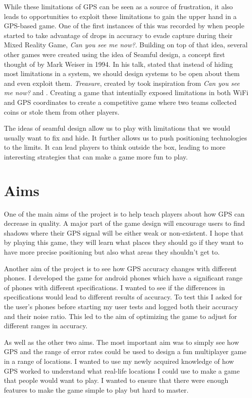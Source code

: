 \documentclass{l4proj}
\begin{document}
While these limitations of GPS can be seen as a source of frustration, it also leads to
opportunities to exploit these limitations to gain the upper hand in a GPS-based game. One
of the first instances of this was recorded by \cite{canyouseeme} when people started to 
take advantage of drops in accuracy to evade capture during their Mixed Reality Game,
\emph{Can you see me now?}. Building on top of that idea, several other games were 
created using the idea of Seamful design, a concept first thought of by Mark Weiser in
1994. In his talk, \cite{weiser1994} stated that instead of hiding most limitations in 
a system, we should design systems to be open about them and even exploit them. \emph{Treasure},
created by \cite{Barkhuus2005} took inspiration from \emph{Can you see me now?} and \cite{weiser1994}.
Creating a game that intentially exposed limitations in both WiFi and GPS coordinates to create
a competitive game where two teams collected coins or stole them from other players.

The ideas of seamful design allow us to play with limitations that we would usually want to fix
and hide. It further allows us to push positioning technologies to the limits. It
can lead players to think outside the box, leading to more interesting strategies that can make a
game more fun to play.

\section{Aims}
\label{aims}
One of the main aims of the project is to help teach players about how GPS can decrease in quality. A major
part of the game design will encourage users to find shadows where their GPS signal will be either weak or
non-existent. I hope that by playing this game, they will learn what places they should
go if they want to have more precise positioning but also what areas they shouldn't get to.

Another aim of the project is to see how GPS accuracy changes with different phones. I developed the game
for android phones which have a significant range of phones with different specifications. I wanted to 
see if the differences in specifications would lead to different results of accuracy. To test this I 
asked for the user's phones before starting my user tests and logged both their accuracy and their noise
ratio. This led to the aim of optimizing the game to adjust for different ranges in accuracy.

As well as the other two aims. The most important aim was to simply see how GPS and the range of
error rates could be used to design a fun multiplayer game in a range of locations. I wanted to use
my newly acquired knowledge of how GPS worked to understand what real-life locations I could use
to make a game that people would want to play. I wanted to ensure that there were enough features
to make the game simple to play but hard to master.
\end{document}
